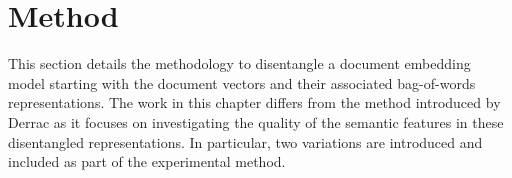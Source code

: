 

\section{Method}\label{ch3:method}

This section details the methodology to disentangle a document embedding model starting with the document vectors and their associated bag-of-words  representations.  The work in this chapter differs from the method introduced by Derrac \cite{Derrac2015} as it focuses on investigating the quality of the semantic features in these disentangled representations. In particular, two variations are introduced and included as part of the experimental method.%






